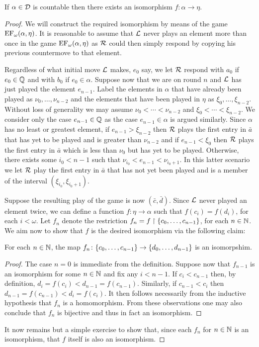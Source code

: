 \begin{thm}\label{thm:cantor}
	If $\alpha\in\mathcal{D}$ is countable then there exists an isomorphism $f\colon\alpha\to\eta$.
\end{thm}
\begin{proof}
	We will construct the required isomorphism by means of the game $\operatorname{EF}_\omega(\alpha,\eta)$. It is reasonable to assume that $\mathcal{L}$ never plays an element more than once in the game $\operatorname{EF}_\omega(\alpha,\eta)$ as $\mathcal{R}$ could then simply respond by copying his previous countermove to that element.

	Regardless of what initial move  $\mathcal{L}$ makes, $e_0$ say, we let $\mathcal{R}$ respond with $a_0$ if $e_0\in\mathbb{Q}$ and with $b_0$ if $e_0\in\alpha$.  Suppose now that we are on round $n$ and $\mathcal{L}$ has just played the element $e_{n-1}$.  Label the elements in $\alpha$ that have already been played as $\nu_0,\dotsc,\nu_{n-2}$ and the elements that have been played in $\eta$ as $\xi_0,\dotsc,\xi_{n-2}$.  Without loss of generality we may assume $\nu_0<\dotsb<\nu_{n-2}$ and $\xi_0<\dotsb<\xi_{n-2}$.  We consider only the case $e_{n-1}\in\mathbb{Q}$ as the case $e_{n-1}\in\alpha$ is argued similarly.  Since $\alpha$ has no least or greatest element, if $e_{n-1}>\xi_{n-2}$ then $\mathcal{R}$ plays the first entry in $\bar{a}$ that has yet to be played and is greater than $\nu_{n-2}$ and if $e_{n-1}<\xi_0$ then $\mathcal{R}$ plays the first entry in $\bar{a}$ which is less than $\nu_0$ but has yet to be played.  Otherwise, there exists some $i_0<n-1$ such that $\nu_{i_0}<e_{n-1}<\nu_{i_0+1}$.  In this latter scenario we let $\mathcal{R}$ play the first entry in $\bar{a}$ that has not yet been played and is a member of the interval $(\xi_{i_0},\xi_{i_0+1})$.

	Suppose the resulting play of the game is now $(\bar{c},\bar{d})$.  Since $\mathcal{L}$ never played an element twice, we can define a function $f\colon\eta\to\alpha$ such that $f(c_i)=f(d_i)$, for each $i<\omega$.  Let $f_n$ denote the restriction $f_n=f\restriction\lbrace c_0,\dotsc,c_{n-1}\rbrace$, for each $n\in\mathbb{N}$.  We aim now to show that $f$ is the desired isomorphism via the following claim:
	\begin{claim}
		For each $n\in\mathbb{N}$, the map $f_n\colon\lbrace c_0,\dotsc,c_{n-1}\rbrace\to\lbrace d_0,\dotsc,d_{n-1}\rbrace$ is an isomorpshim.
	\end{claim}
	\begin{proof}
		The case $n=0$ is immediate from the definition.  Suppose now that $f_{n-1}$ is an isomorphism for some $n\in\mathbb{N}$ and fix any $i<n-1$.  If $c_i<c_{n-1}$ then, by definition, $d_i=f(c_i)<d_{n-1}=f(c_{n-1})$. Similarly, if $c_{n-1}<c_i$ then $d_{n-1}=f(c_{n-1})<d_i=f(c_i)$.  It then follows necessarily from the inductive hypothesis that $f_n$ is a homomorphism.  From these observations one may also conclude that $f_n$ is bijective and thus in fact an isomorphism.
	\end{proof}
	It now remains but a simple exercise to show that, since each $f_n$ for $n\in\mathbb{N}$ is an isomorphism, that $f$ itself is also an isomorphism.
\end{proof}

